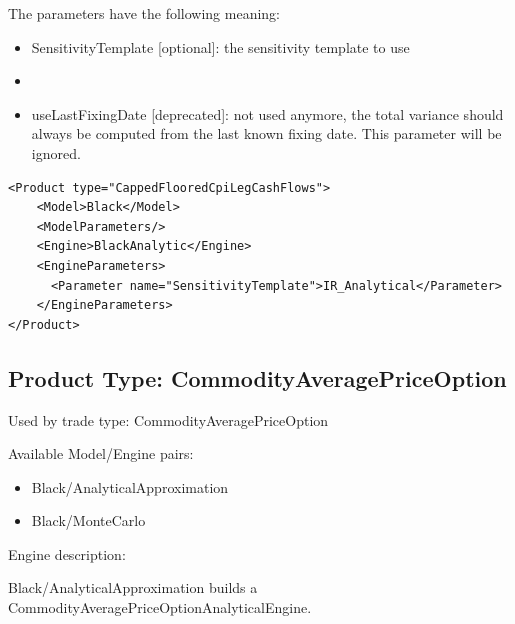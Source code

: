 The parameters have the following meaning:

\begin{itemize}
\item SensitivityTemplate [optional]: the sensitivity template to use
\item \item useLastFixingDate [deprecated]: not used anymore, the total
variance should always be computed from the last known fixing date. This parameter will be ignored.
\end{itemize}

\begin{longlisting}
\begin{verbatim}
<Product type="CappedFlooredCpiLegCashFlows">
    <Model>Black</Model>
    <ModelParameters/>
    <Engine>BlackAnalytic</Engine>
    <EngineParameters>
      <Parameter name="SensitivityTemplate">IR_Analytical</Parameter>
    </EngineParameters>
</Product>
\end{verbatim}
\caption{Configuration for Product CapFlooredCpiLegCoupons, Model Black, Engine BlackAnalytic}
\label{lst:peconfig_CappedFlooredCpiLegCashFlows_Black_BlackAnalytic}
\end{longlisting}

\subsection{Product Type: CommodityAveragePriceOption}

Used by trade type: CommodityAveragePriceOption

Available Model/Engine pairs:

\begin{itemize}
\item Black/AnalyticalApproximation
\item Black/MonteCarlo
\end{itemize}

Engine description:

Black/AnalyticalApproximation builds a CommodityAveragePriceOptionAnalyticalEngine.

